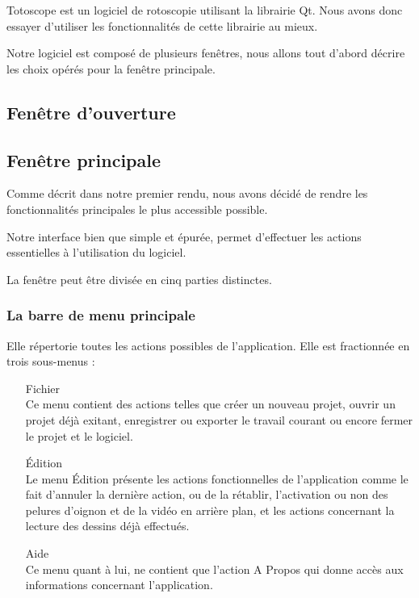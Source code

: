 
Totoscope est un logiciel de rotoscopie utilisant la librairie Qt. Nous avons donc essayer d'utiliser les fonctionnalités de cette librairie au mieux.

Notre logiciel est composé de plusieurs fenêtres, nous allons tout d'abord décrire les choix opérés pour la fenêtre principale.

\subsection{Fenêtre d'ouverture}
	

\subsection{Fenêtre principale}
	Comme décrit dans notre premier rendu, nous avons décidé de rendre les fonctionnalités principales le plus accessible possible. 
	

	Notre interface bien que simple et épurée, permet d'effectuer les actions essentielles à l'utilisation du logiciel.
	
	La fenêtre peut être divisée en cinq parties distinctes.
	\subsubsection{La barre de menu principale}
	Elle répertorie toutes les actions possibles de l'application. Elle est fractionnée en trois sous-menus :
	\begin{itemize}
		\item[Fichier] \hfill \\
			Ce menu contient des actions telles que créer un nouveau projet, ouvrir un projet déjà exitant, enregistrer ou exporter le travail courant ou encore fermer le projet et le logiciel.
		\item[\'Edition] \hfill \\
			Le menu \'Edition présente les actions fonctionnelles de l'application comme le fait d'annuler la dernière action, ou de la rétablir, l'activation ou non des pelures d'oignon et de la vidéo en arrière plan, et les actions concernant la lecture des dessins déjà effectués.
		\item[Aide] \hfill \\
			Ce menu quant à lui, ne contient que l'action A Propos qui donne accès aux informations concernant l'application.
	\end{itemize}
	
